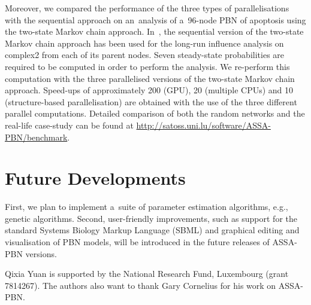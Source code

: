 \documentclass[runningheads,a4paper]{llncs}
\begin{document}

Moreover, we compared the performance of the three types of parallelisations with the sequential
approach on an~analysis of a~96-node PBN of apoptosis using the two-state Markov chain approach.
In~\cite{MPY15}, the sequential version of the two-state Markov chain approach has been used for
the long-run influence analysis on complex2 from each of its parent nodes. Seven steady-state
probabilities are required to be computed in order to perform the analysis. We re-perform this
computation with the three parallelised versions of the two-state Markov chain approach.
Speed-ups of approximately 200 (GPU), 20 (multiple CPUs) and 10 (structure-based parallelisation)
are obtained with the use of the three different parallel computations.
Detailed comparison of both the random networks and the real-life case-study can be found at
\url{http://satoss.uni.lu/software/ASSA-PBN/benchmark}.

\section{Future Developments}
\label{sec:future}
First, we plan to implement a~suite of parameter estimation algorithms, e.g., genetic
algorithms. Second, user-friendly improvements, such as support for the standard Systems Biology
Markup Language (SBML) and graphical editing and visualisation of PBN models, will be introduced in the future
releases of {\sf ASSA-PBN} versions.

\medskip{}
Qixia Yuan is supported by the National Research Fund, Luxembourg (grant 7814267).
The authors also want to thank Gary Cornelius for his work on {\sf ASSA-PBN}.



\end{document}
